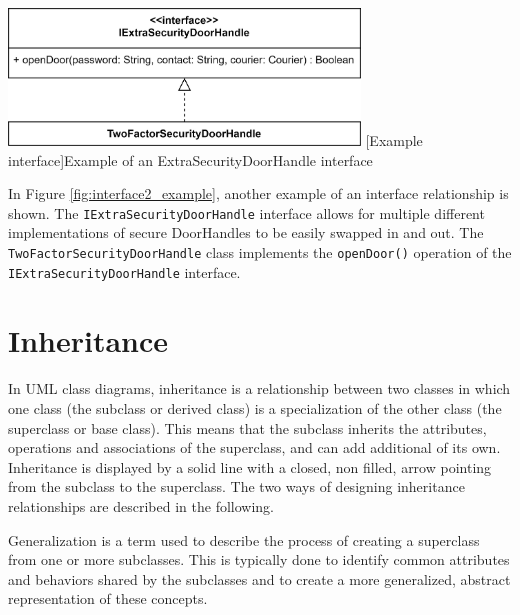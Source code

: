 \documentclass[
	12pt,
    a4paper,
    egregdoesnotlikesansseriftitles, %
    toc=chapterentrywithdots,
    oneside, openany,
    titlepage,
    parskip=half,
    headings=normal,  %
    listof=totoc,
    bibliography=totocnumbered,
    index=totoc,
    captions=tableheading,  %
    listof=flat,
    numbers=noenddot, %
    final]
    {scrbook}
\begin{document}
\vspace{1em}
\begin{minipage}{\linewidth}
	\centering
	\includegraphics[width=0.7\textwidth]{figures/interface/doorhandle_sec_interface.jpg}
	[Example interface]{Example of an ExtraSecurityDoorHandle interface}
	\label{fig:interface2_example}
\end{minipage}

In Figure \ref{fig:interface2_example}, another example of an interface relationship is shown. 
The \texttt{IExtraSecurityDoorHandle} interface allows for multiple different implementations of secure DoorHandles to be easily swapped in and out. The \texttt{TwoFactorSecurityDoorHandle} class implements the \texttt{openDoor()} operation of the \texttt{IExtraSecurityDoorHandle} interface.


\chapter{Inheritance}
In UML class diagrams, inheritance is a relationship between two classes in which one class (the subclass or derived class) is a specialization of the other class (the superclass or base class). 
This means that the subclass inherits the attributes, operations and associations of the superclass, and can add additional of its own.
Inheritance is displayed by a solid line with a closed, non filled, arrow pointing from the subclass to the superclass.
The two ways of designing inheritance relationships are described in the following.

Generalization is a term used to describe the process of creating a superclass from one or more subclasses. 
This is typically done to identify common attributes and behaviors shared by the subclasses and to create a more generalized, abstract representation of these concepts. \cite[p. 69-70] {seidl2015uml} \cite{ibm_generalization}
\end{document}
